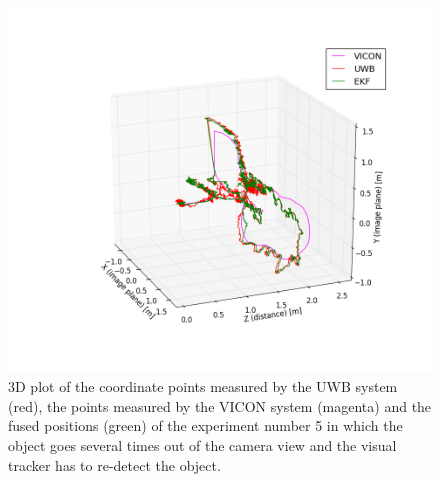\begin{figure}[ht!]\centering
	\includegraphics[width=1.0\textwidth]{figures/evaluation_redetect}
	\caption{3D plot of the coordinate points measured by the \ac{UWB} system (red), the points measured by the VICON system (magenta) and the fused positions (green) of the experiment number 5 in which the object goes several times out of the camera view and the visual tracker has to re-detect the object.}\label{fig:evaluation_redetect}
\end{figure}
